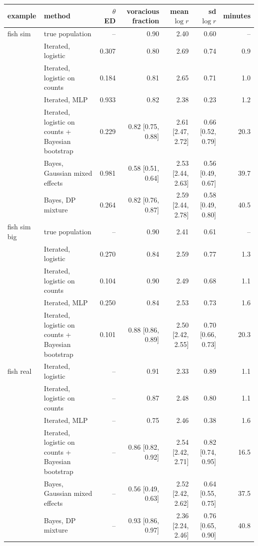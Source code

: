 \begin{tabular}{llrrrrr}
\toprule
example & method & $\theta$ ED & voracious fraction & mean $\log r$ & sd $\log r$ & minutes \\
\midrule
fish sim & true population & -- & 0.90 & 2.40 & 0.60 & -- \\
 & Iterated, logistic & 0.307 & 0.80 & 2.69 & 0.74 & 0.9 \\
 & Iterated, logistic on counts & 0.184 & 0.81 & 2.65 & 0.71 & 1.0 \\
 & Iterated, MLP & 0.933 & 0.82 & 2.38 & 0.23 & 1.2 \\
 & Iterated, logistic on counts + Bayesian bootstrap & 0.229 & 0.82 [0.75, 0.88] & 2.61 [2.47, 2.72] & 0.66 [0.52, 0.79] & 20.3 \\
 & Bayes, Gaussian mixed effects & 0.981 & 0.58 [0.51, 0.64] & 2.53 [2.44, 2.63] & 0.56 [0.49, 0.67] & 39.7 \\
 & Bayes, DP mixture & 0.264 & 0.82 [0.76, 0.87] & 2.59 [2.44, 2.78] & 0.58 [0.49, 0.80] & 40.5 \\ \addlinespace
fish sim big & true population & -- & 0.90 & 2.41 & 0.61 & -- \\
 & Iterated, logistic & 0.270 & 0.84 & 2.59 & 0.77 & 1.3 \\
 & Iterated, logistic on counts & 0.104 & 0.90 & 2.49 & 0.68 & 1.1 \\
 & Iterated, MLP & 0.250 & 0.84 & 2.53 & 0.73 & 1.6 \\
 & Iterated, logistic on counts + Bayesian bootstrap & 0.101 & 0.88 [0.86, 0.89] & 2.50 [2.42, 2.55] & 0.70 [0.66, 0.73] & 20.3 \\ \addlinespace
fish real & Iterated, logistic & -- & 0.91 & 2.33 & 0.89 & 1.1 \\
 & Iterated, logistic on counts & -- & 0.87 & 2.48 & 0.80 & 1.1 \\
 & Iterated, MLP & -- & 0.75 & 2.46 & 0.38 & 1.6 \\
 & Iterated, logistic on counts + Bayesian bootstrap & -- & 0.86 [0.82, 0.92] & 2.54 [2.42, 2.71] & 0.82 [0.74, 0.95] & 16.5 \\
 & Bayes, Gaussian mixed effects & -- & 0.56 [0.49, 0.63] & 2.52 [2.42, 2.62] & 0.64 [0.55, 0.75] & 37.5 \\
 & Bayes, DP mixture & -- & 0.93 [0.86, 0.97] & 2.36 [2.24, 2.46] & 0.76 [0.65, 0.90] & 40.8 \\
\bottomrule
\end{tabular}
